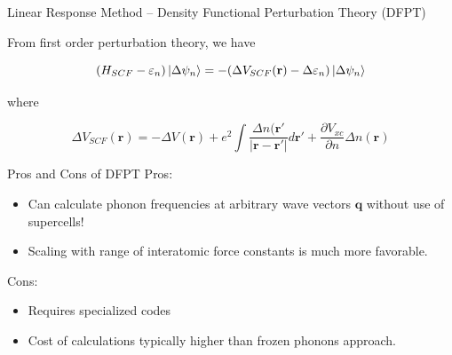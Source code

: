 \documentclass[aspectratio=169]{beamer}
\let \vec \mathbf
\begin{document}
    \begin{frame}{Linear Response Method – Density Functional Perturbation Theory (DFPT)}

        From first order perturbation theory, we have

        \begin{equation*}
        (H_{SCF} - \varepsilon_n)
            \ket{\Delta \psi_n} = -(\Delta V_{SCF}(\vec{r})-\Delta \varepsilon_n) \ket{\Delta \psi_n}
        \end{equation*}

        where

        \begin{equation*}
            \Delta V_{SCF}(\vec{r}) = -\Delta V(\vec{r}) + e^2 \int \frac{ \Delta n(\vec{r}'}{|\vec{r}-\vec{r'}|} d \vec{r'} + \frac{\partial V_{xc}}{\partial n} \Delta n(\vec{r})
        \end{equation*}

    \end{frame}

    \begin{frame}{Pros and Cons of DFPT}
        Pros:
        \begin{itemize}
            \item Can calculate phonon frequencies at arbitrary wave vectors $\vec{q}$ without use of supercells!
            \item Scaling with range of interatomic force constants is much more favorable.
        \end{itemize}

        Cons:
        \begin{itemize}
            \item Requires specialized codes
            \item Cost of calculations typically higher than frozen phonons approach.
        \end{itemize}

    \end{frame}
\end{document}
